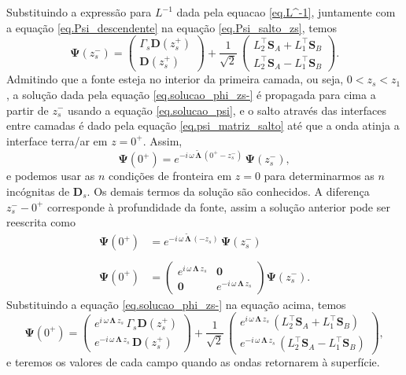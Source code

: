 Substituindo a express\~ao para $L^{-1}$ dada pela equacao \ref{eq.L^-1}, juntamente com a equa\c{c}\~ao \ref{eq.Psi_descendente} na equa\c{c}\~ao \ref{eq.Psi_salto_zs}, temos
\begin{equation}\label{eq.solucao_phi_zs-}
\mathbf{\Psi}(z_s^-)=
\begin{pmatrix}
\Gamma_s\mathbf{D}(z_s^+)\\
\mathbf{D}(z_s^+)
\end{pmatrix}
+
\frac{1}{\sqrt{2}}\,
\begin{pmatrix}
L_2^\top\mathbf{S}_A+L_1^\top\mathbf{S}_B\\
L_2^\top\mathbf{S}_A-L_1^\top\mathbf{S}_B
\end{pmatrix}.
\end{equation}
Admitindo que a fonte esteja no interior da primeira camada, ou seja, $0<z_s<z_1$, a solu\c{c}\~ao dada pela equa\c{c}\~ao \ref{eq.solucao_phi_zs-} \'e propagada para cima a partir de $z_s^-$ usando a equa\c{c}\~ao \ref{eq.solucao_psi}, e o salto atrav\'es das interfaces entre camadas \'e dado pela equa\c{c}\~ao \ref{eq.psi_matriz_salto} at\'e que a onda atinja a interface terra/ar em $z=0^+$. Assim,
\begin{equation*}
\mathbf{\Psi}(0^+)=e^{-i\,\omega\,\tilde{\mathbf{\Lambda}}\,(0^+-z_s^-)}\,\mathbf{\Psi}(z_s^-),
\end{equation*}
e podemos usar as $n$ condi\c{c}\~oes de fronteira em $z=0$ para determinarmos as $n$ inc\'ognitas de $\mathbf{D}_s$. Os demais termos da solu\c{c}\~ao s\~ao conhecidos. A diferen\c{c}a $z_s^--0^+$ corresponde \`a profundidade da fonte, assim a solu\c{c}\~ao anterior pode ser reescrita como
\begin{align*}
\mathbf{\Psi}(0^+)&=e^{-i\,\omega\,\tilde{\mathbf{\Lambda}}\,(-z_s)}\,\mathbf{\Psi}(z_s^-)\\\\
\mathbf{\Psi}(0^+)&=
\begin{pmatrix}
e^{i\,\omega\,\mathbf{\Lambda}\,z_s}&\mathbf{0}\\
\mathbf{0}&e^{-i\,\omega\,\mathbf{\Lambda}\,z_s}
\end{pmatrix}
\mathbf{\Psi}(z_s^-).
\end{align*}
Substituindo a equa\c{c}\~ao \ref{eq.solucao_phi_zs-} na equa\c{c}\~ao acima, temos
\begin{equation}\label{eq.Psi_zero+}
\mathbf{\Psi}(0^+)=
\begin{pmatrix}
e^{i\,\omega\,\mathbf{\Lambda}\,z_s}\,\Gamma_s\mathbf{D}(z_s^+)\\
e^{-i\,\omega\,\mathbf{\Lambda}\,z_s}\,\mathbf{D}(z_s^+)
\end{pmatrix}
+
\frac{1}{\sqrt{2}}\,
\begin{pmatrix}
e^{i\,\omega\,\mathbf{\Lambda}\,z_s}\,(L_2^\top\mathbf{S}_A+L_1^\top\mathbf{S}_B)\\
e^{-i\,\omega\,\mathbf{\Lambda}\,z_s}\,(L_2^\top\mathbf{S}_A-L_1^\top\mathbf{S}_B)
\end{pmatrix},
\end{equation}
e teremos os valores de cada campo quando as ondas retornarem \`a superf\'icie.

